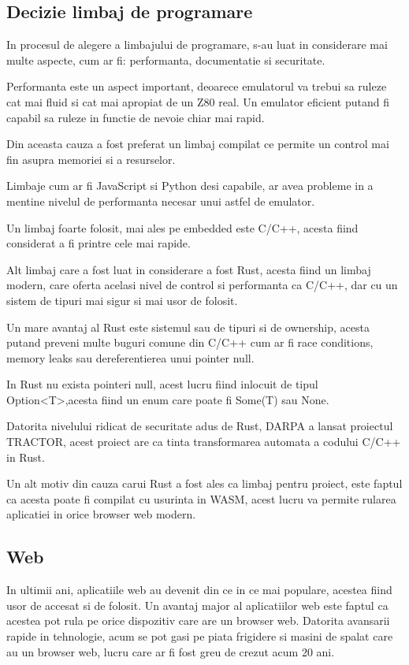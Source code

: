 \documentclass[titlepage,12pt]{article}
\begin{document}
\subsection{Decizie limbaj de programare}

In procesul de alegere a limbajului de programare, s-au luat in considerare mai multe aspecte, cum ar fi:
performanta, documentatie si securitate.

Performanta este un aspect important, deoarece emulatorul va trebui sa ruleze cat mai fluid si cat mai apropiat de un Z80 real.
Un emulator eficient putand fi capabil sa ruleze in functie de nevoie chiar mai rapid.

Din aceasta cauza a fost preferat un limbaj compilat ce permite un control mai fin asupra memoriei si a resurselor.

Limbaje cum ar fi JavaScript si Python desi capabile, ar avea probleme in a mentine nivelul de performanta necesar unui astfel de emulator.

Un limbaj foarte folosit, mai ales pe embedded este C/C++, acesta fiind considerat a fi printre cele mai rapide.

Alt limbaj care a fost luat in considerare a fost Rust, acesta fiind un limbaj modern,
care oferta acelasi nivel de control si performanta ca C/C++, dar cu un sistem de tipuri mai sigur si mai usor de folosit.

Un mare avantaj al \ac {Rust} este sistemul sau de tipuri si de ownership,
acesta putand preveni multe buguri comune din C/C++ cum ar fi race conditions, memory leaks sau dereferentierea unui pointer null.

In \ac {Rust} nu exista pointeri null, acest lucru fiind inlocuit de tipul Option<T>,acesta fiind un enum care poate fi Some(T) sau None.

Datorita nivelului ridicat de securitate adus de Rust,
\ac {DARPA} a lansat proiectul TRACTOR, acest proiect are ca tinta transformarea automata a codului C/C++ in Rust.

Un alt motiv din cauza carui \ac {Rust} a fost ales ca limbaj pentru proiect, este faptul ca acesta poate fi compilat cu usurinta in \ac {WASM},
acest lucru va permite rularea aplicatiei in orice browser web modern.

\subsection{Web}

In ultimii ani, aplicatiile web au devenit din ce in ce mai populare, acestea fiind usor de accesat si de folosit.
Un avantaj major al aplicatiilor web este faptul ca acestea pot rula pe orice dispozitiv care are un browser web.
Datorita avansarii rapide in tehnologie, acum se pot gasi pe piata frigidere si masini de spalat care au un browser web, lucru care ar fi fost greu de crezut acum 20 ani.
\end{document}
